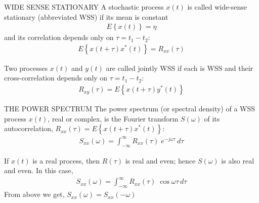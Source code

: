 \documentclass{beamer}
\providecommand{\cbrak}[1]{\ensuremath{\left\{#1\right\}}}
\begin{document}
\begin{frame}{}
   \begin{block}{WIDE SENSE STATIONARY}
      A stochastic process $x(t)$ is called wide-sense stationary 
(abbreviated WSS) if its mean is constant 
      \begin{align}
        E\cbrak{x(t)} = \eta
	  \end{align} 
	  and its correlation depends only on $\tau=t_1 - t_2$:
	  \begin{align}
	    E\cbrak{x(t+\tau)x^*(t)} = R_{xx}(\tau)
      \end{align}
      	        
   \end{block}
   
   \begin{block}{}
     Two processes $x(t)$ and $y(t)$ are called jointly WSS if each is WSS and their cross-correlation depends only on $\tau = t_1 - t_2$: 
      \begin{align}
	     R_{xy}(\tau) = E\cbrak{x(t+\tau)y^*(t)}
      \end{align} 
      
   \end{block}
   
\end{frame}


\begin{frame}
   \begin{block}{THE POWER SPECTRUM}
      The power spectrum (or spectral density) of a WSS process $x(t)$, real 
or complex, is the Fourier transform $S(\omega)$ of its autocorrelation, $R_{xx}(\tau)=E\cbrak{x(t+\tau)x^*(t)}$:
	   \begin{align}
	      S_{xx}(\omega) = \int_{-\infty}^{\infty} R_{xx}(\tau)\; e^{-j\omega \tau} \, d\tau
	   \end{align}
	   
   \end{block}
   
   \begin{block}{}
   	  If $x(t)$ is a real process, then $R(\tau)$ is real and even; hence $S(\omega)$ is also real and even. In this case,
   	   \begin{align}
	      S_{xx}(\omega) = \int_{-\infty}^{\infty} R_{xx}(\tau)\; \cos \omega \tau \, d\tau
	   \end{align} 
	  From above we get, $S_{xx}(\omega)=S_{xx}(-\omega)$
	  
   \end{block}
\end{frame}
\end{document}
